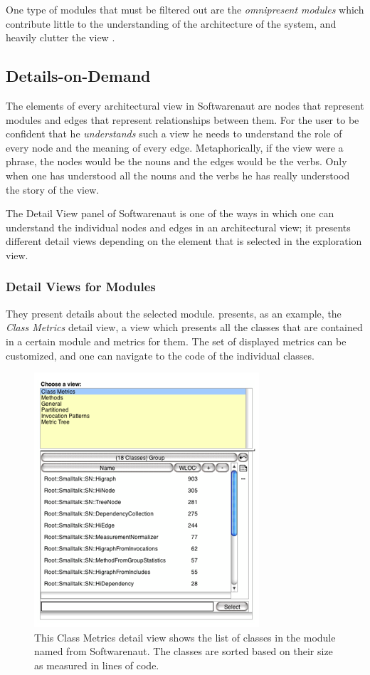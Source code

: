 \documentclass[preprint,12pt]{elsarticle}
\begin{document}
One type of modules that must be filtered out are the {\em omnipresent modules} which contribute little to the understanding of the architecture of the system, and heavily clutter the view \cite{mitchell-bunch}.


\newpage
\subsection {Details-on-Demand}


The elements of every architectural view in Softwarenaut are nodes that represent modules and edges that represent relationships between them. For the user to be confident that he {\em understands} such a view he needs to understand the role of every node and the meaning of every edge. Metaphorically, if the view were a phrase, the nodes would be the nouns and the edges would be the verbs. Only when one has understood all the nouns and the verbs he has really understood the story of the view.  

The Detail View panel of Softwarenaut is one of the ways in which one can understand the individual nodes and edges in an architectural view; it presents different detail views depending on the element that is selected in the exploration view. %



\subsubsection {Detail Views for Modules}
They present details about the selected module.  presents, as an example, the {\em Class Metrics} detail view, a view which presents all the classes that are contained in a certain module and metrics for them. The set of displayed metrics can be customized, and one can navigate to the code of the individual classes. 

\begin{figure}[h]
\begin{center}
\includegraphics[width=0.43\linewidth]{images/DetailForNode.png}
\caption{This Class Metrics detail view shows the list of classes in the module named  from Softwarenaut. The classes are sorted based on their size as measured in lines of code.}

\end{center}
\end{figure}
\end{document}
